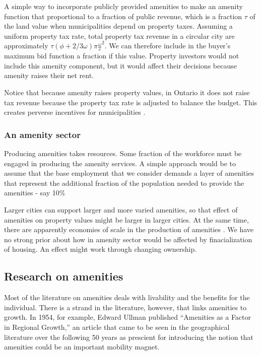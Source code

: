 A simple way to incorporate publicly provided amenities to make an amenity function that proportional to a fraction of public revenue, which is a fraction $\tau$ of the land value when municipalities depend on property taxes. Assuming a uniform property tax rate, total property tax revenue in a circular city are approximately $\tau(\phi+2/3 \omega)\pi \frac{\omega}{c}^2$. We can therefore include in the buyer's maximum bid function a fraction if this value. Property investors would not include this amenity component, but it would affect their decisions because amenity raises their net rent.

Notice that because amenity raises property values, in Ontario it does not raise tax revenue because the property tax rate is adjusted to balance the budget. This creates perverse incentives for municipalities \cite{blaisPerverseCitiesHidden2011}.


\subsubsection{An amenity sector}
Producing amenities takes resources. Some fraction of the workforce must be engaged in producing the amenity services. A simple approach would be to assume that the base employment that we consider demands a layer of amenities that represent the additional fraction of the population needed to provide the amenities - say 10\%  

Larger cities can support larger and more varied amenities, so that effect of amenities on property values might be larger in larger cities. At the same time, there are apparently economies of scale in the production of amenities \cite{kaufmannScalingUrbanAmenities2022}. We have no strong prior about how in amenity sector would be affected by finacialization of housing.  An effect might work through changing ownership.


\subsection{Research on amenities}
Most of the literature on amenities deals with livability and the benefits for the individual. There is a strand in the literature, however, that links amenities to growth. In 1954, for example, Edward Ullman \cite{ullmanAmenitiesFactorRegional1954} published  ``Amenities as a Factor in Regional Growth,'' an article that came to be seen in the geographical literature over the following 50 years as prescient \cite{walcottCommentsEdwardUllman2010} for introducing the notion that amenities could be an important mobility magnet. 

